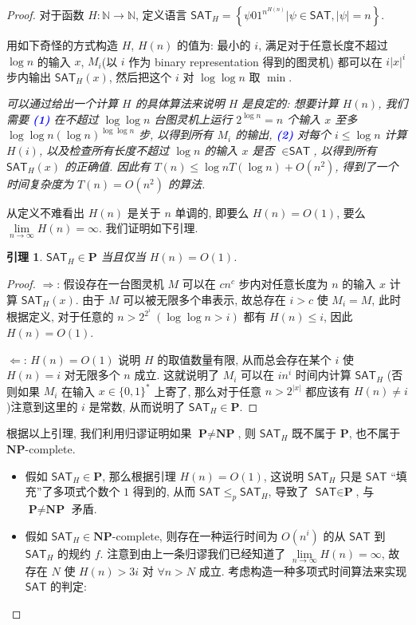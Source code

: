 \documentclass[8pt]{article}
\theoremstyle{compact}
\newtheorem{lemma}{引理}[section]
\def\num#1{\textnormal{\textbf{\mbox{\textcolor{blue}{(#1)}}}}}
\def\le{\leqslant}
\def\P{\textbf{P}}
\def\NP{\textbf{NP}}
\begin{document}
\begin{proof}
	对于函数 $H: \mathbb N \to \mathbb N$, 定义语言 $\textsf{SAT}_H = \left\{ \psi01^{n^{H(n)}} | \psi \in \textsf{SAT}, |\psi| = n \right\}$.

	用如下奇怪的方式构造 $H$, $H(n)$ 的值为: 最小的 $i$, 满足对于任意长度不超过 $\log n$ 的输入 $x$, $M_i$(以 $i$ 作为 binary representation 得到的图灵机) 都可以在 $i|x|^i$ 步内输出 $\textsf{SAT}_H(x)$, 然后把这个 $i$ 对 $\log \log n$ 取 $\min$.

	\textit{
		可以通过给出一个计算 $H$ 的具体算法来说明 $H$ 是良定的: 想要计算 $H(n)$, 我们需要 \num{1} 在不超过 $\log \log n$ 台图灵机上运行 $2^{\log n} = n$ 个输入 $x$ 至多 $\log \log n (\log n)^{\log \log n}$ 步, 以得到所有 $M_i$ 的输出, \num{2} 对每个 $i \le \log n$ 计算 $H(i)$, 以及检查所有长度不超过 $\log n$ 的输入 $x$ 是否 $\in \textsf{SAT}$, 以得到所有 $\textsf{SAT}_H(x)$ 的正确值. 因此有 $T(n) \le \log n T(\log n) + O(n^2)$, 得到了一个时间复杂度为 $T(n) = O(n^2)$ 的算法.
	}

	从定义不难看出 $H(n)$ 是关于 $n$ 单调的, 即要么 $H(n) = O(1)$, 要么 $\lim\limits_{n \to \infty} H(n) = \infty$. 我们证明如下引理.
	\begin{lemma}
		$\textsf{SAT}_H \in \P$ 当且仅当 $H(n) = O(1)$.
	\end{lemma}
	\begin{proof}
		$\Rightarrow$: 假设存在一台图灵机 $M$ 可以在 $cn^c$ 步内对任意长度为 $n$ 的输入 $x$ 计算 $\textsf{SAT}_H(x)$. 由于 $M$ 可以被无限多个串表示, 故总存在 $i > c$ 使 $M_i = M$, 此时根据定义, 对于任意的 $n > 2^{2^i} \ (\log \log n > i)$ 都有 $H(n) \le i$, 因此 $H(n) = O(1)$.

		$\Leftarrow$: $H(n) = O(1)$ 说明 $H$ 的取值数量有限, 从而总会存在某个 $i$ 使 $H(n) = i$ 对无限多个 $n$ 成立. 这就说明了 $M_i$ 可以在 $in^i$ 时间内计算 $\textsf{SAT}_H$ (否则如果 $M_i$ 在输入 $x \in \{0, 1\}^*$ 上寄了, 那么对于任意 $n > 2^{|x|}$ 都应该有 $H(n) \neq i$)注意到这里的 $i$ 是常数, 从而说明了 $\textsf{SAT}_H \in \P$.
	\end{proof}

	根据以上引理, 我们利用归谬证明如果 $\P \neq \NP$, 则 $\textsf{SAT}_H$ 既不属于 $\P$, 也不属于 $\NP$-complete.

	\begin{itemize}
		\item 假如 $\textsf{SAT}_H \in \P$, 那么根据引理 $H(n) = O(1)$, 这说明 $\textsf{SAT}_H$ 只是 $\textsf{SAT}$ “填充”了多项式个数个 $1$ 得到的, 从而 $\textsf{SAT} \le_p \textsf{SAT}_H$, 导致了 $\textsf{SAT} \in \P$, 与 $\P \neq \NP$ 矛盾.
		\item 假如 $\textsf{SAT}_H \in \NP$-complete, 则存在一种运行时间为 $O(n^i)$ 的从 $\textsf{SAT}$ 到 $\textsf{SAT}_H$ 的规约 $f$. 注意到由上一条归谬我们已经知道了 $\lim\limits_{n \to \infty}H(n) = \infty$, 故存在 $N$ 使 $H(n) > 3i$ 对 $\forall n > N$ 成立. 考虑构造一种多项式时间算法来实现 $\textsf{SAT}$ 的判定: 
		

\end{itemize}
\end{proof}
\end{document}
